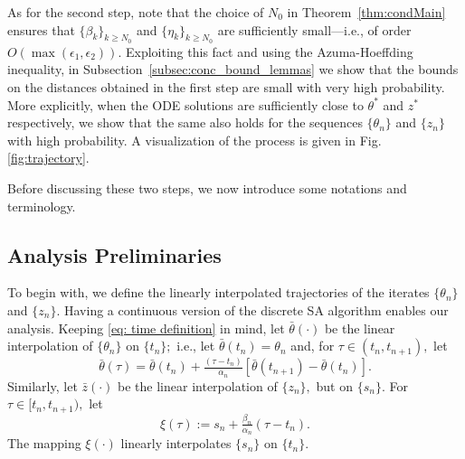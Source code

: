 \documentclass[usenames,dvipsnames,final,12pt]{colt2018} %
\newcommand{\st}{\alpha}
\newcommand{\et}{\epsilon_1}
\newcommand{\Rti}{R_1^{\textrm{in}}}
\newcommand{\thS}{\theta^*}
\newcommand{\bart}{\bar{\theta}}
\newcommand{\ez}{\epsilon_2}
\newcommand{\Rzi}{R_2^{\textrm{in}}}
\newcommand{\barz}{\bar{z}}
\newcommand{\tI}[1]{t_{#1}}
\newcommand{\sI}[1]{s_{#1}}
\newcommand{\norm}[1]{\left\lVert#1\right\rVert}
\newcommand{\zS}{z^*}
\newcommand{\gal}[1]{#1}
\newcommand{\gugan}[1]{#1}
\begin{document}
As for the second step, note that the choice of $N_0$ in Theorem~\ref{thm:condMain}
ensures that $\{\beta_k\}_{k \geq N_0}$ and $\{\eta_k\}_{k \geq N_0}$ are sufficiently small---i.e., of order $O(\max(\et,\ez))$.
Exploiting this fact and using the Azuma-Hoeffding %
inequality, in Subsection~\ref{subsec:conc_bound_lemmas}
we show that the bounds on the distances obtained in the first step are small with very high probability.
More explicitly, when the ODE solutions %
are sufficiently close to $\thS$ and $\zS$ respectively, \gugan{we show that} the same also holds for
the sequences $\{\theta_n\}$ and $\{z_n\}$
with high probability.
A visualization of the process is given in Fig. \ref{fig:trajectory}.

Before discussing these two steps, we now introduce some notations and terminology.

\subsection{Analysis Preliminaries}
\label{subsection: analysis preliminaries}

\gugan{To begin with,} we define the linearly interpolated trajectories of the iterates $\{\theta_n\}$ and $\{z_n\}.$ Having a continuous version of the discrete SA algorithm enables our analysis. Keeping \eqref{eq: time definition} in mind, let $\bart(\cdot)$ be the linear interpolation of $\{\theta_n\}$ on $\{t_n\};$ i.e., let $\bart(t_n) = \theta_n$ and, for $\tau \in (t_n, t_{n + 1}),$ let
\begin{equation}
\label{eqn:xLinearInterpolation}
\bart(\tau) = \bart(t_{n}) + \tfrac{(\tau - t_n)}{\st_n} [\bart(t_{n + 1}) - \bart(t_{n})].
\end{equation}
%
\gugan{Similarly,} let $\barz(\cdot)$ be the linear interpolation of $\{z_n\},$ but on  $\{s_n\}.$ For $\tau \in [\tI{n}, \tI{n + 1}),$ let
%
\begin{equation}
\label{defn:xi}
\xi(\tau) := s_n + \tfrac{\beta_n}{\alpha_n}(\tau - t_n).
\end{equation}
%
The mapping $\xi(\cdot)$ linearly interpolates $\{\sI{n}\}$ on $\{\tI{n}\}.$
\end{document}
